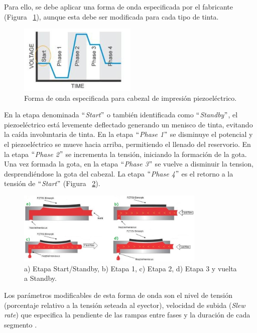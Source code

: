 Para ello, se debe aplicar una forma de onda especificada por el fabricante (Figura ~\ref{fig:Figura_Waveform_Dimatix}), aunque esta debe ser modificada para cada tipo de tinta. 

\begin{figure}[H]
  \centering
    \includegraphics[width=0.5\textwidth]{Figuras/Figura_Waveform_Dimatix}
  \caption{Forma de onda especificada para cabezal de impresión piezoeléctrico.}
  \label{fig:Figura_Waveform_Dimatix}
\end{figure}

En la etapa denominada $``$\textit{Start}$"$ o también identificada como $``$\textit{Standby}$"$, el piezoeléctrico está levemente deflectado generando un menisco de tinta, evitando la caída involuntaria de tinta. En la etapa $``$\textit{Phase 1}$"$ se disminuye el potencial y el piezoeléctrico se mueve hacia arriba, permitiendo el llenado del reservorio. En la etapa $``$\textit{Phase 2}$"$ se incrementa la tensión, iniciando la formación de la gota. Una vez formada la gota, en la etapa $``$\textit{Phase 3}$"$ se vuelve a disminuir la tension, desprendiéndose la gota del cabezal. La etapa $``$\textit{Phase 4}$"$ es el retorno a la tensión de $``$\textit{Start}$"$ (Figura ~\ref{fig:Figura_etapas_eyector}).

\begin{figure}[H]
  \centering
    \includegraphics[width=0.8\textwidth]{Figuras/Figura_etapas_eyector}
  \caption{a) Etapa Start/Standby, b) Etapa 1, c) Etapa 2, d) Etapa 3 y vuelta a Standby.}
  \label{fig:Figura_etapas_eyector}
\end{figure}

Los parámetros modificables de esta forma de onda son el nivel de tensión (porcentaje relativo a la tensión seteada al eyector), velocidad de subida (\textit{Slew rate}) que especifica la pendiente de las rampas entre fases y la duración de cada segmento \cite{DimatixUM}.

